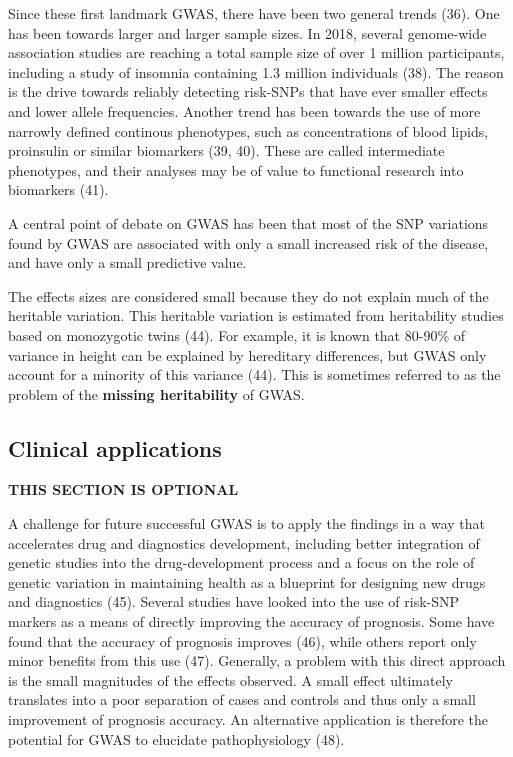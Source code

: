 \documentclass[
]{book}
\begin{document}
Since these first landmark GWAS, there have been two general trends (36). One has been towards larger and larger sample sizes. In 2018, several genome-wide association studies are reaching a total sample size of over 1 million participants, including a study of insomnia containing 1.3 million individuals (38). The reason is the drive towards reliably detecting risk-SNPs that have ever smaller effects and lower allele frequencies. Another trend has been towards the use of more narrowly defined continous phenotypes, such as concentrations of blood lipids, proinsulin or similar biomarkers (39, 40). These are called intermediate phenotypes, and their analyses may be of value to functional research into biomarkers (41).

A central point of debate on GWAS has been that most of the SNP variations found by GWAS are associated with only a small increased risk of the disease, and have only a small predictive value.

The effects sizes are considered small because they do not explain much of the heritable variation. This heritable variation is estimated from heritability studies based on monozygotic twins (44). For example, it is known that 80-90\% of variance in height can be explained by hereditary differences, but GWAS only account for a minority of this variance (44). This is sometimes referred to as the problem of the \textbf{missing heritability} of GWAS.

\hypertarget{clinical-applications}{%
\subsection{Clinical applications}\label{clinical-applications}}

\textbf{THIS SECTION IS OPTIONAL}

A challenge for future successful GWAS is to apply the findings in a way that accelerates drug and diagnostics development, including better integration of genetic studies into the drug-development process and a focus on the role of genetic variation in maintaining health as a blueprint for designing new drugs and diagnostics (45). Several studies have looked into the use of risk-SNP markers as a means of directly improving the accuracy of prognosis. Some have found that the accuracy of prognosis improves (46), while others report only minor benefits from this use (47). Generally, a problem with this direct approach is the small magnitudes of the effects observed. A small effect ultimately translates into a poor separation of cases and controls and thus only a small improvement of prognosis accuracy. An alternative application is therefore the potential for GWAS to elucidate pathophysiology (48).
\end{document}
